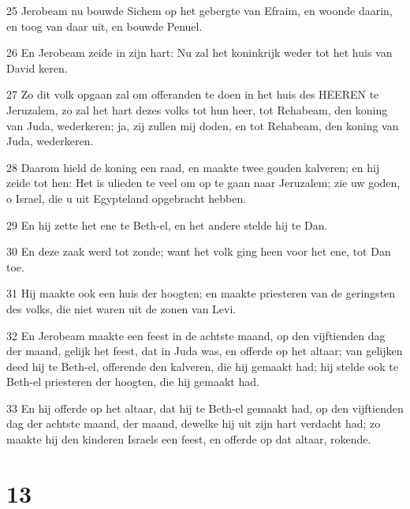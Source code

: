 \par 25 Jerobeam nu bouwde Sichem op het gebergte van Efraim, en woonde daarin, en toog van daar uit, en bouwde Penuel.
\par 26 En Jerobeam zeide in zijn hart: Nu zal het koninkrijk weder tot het huis van David keren.
\par 27 Zo dit volk opgaan zal om offeranden te doen in het huis des HEEREN te Jeruzalem, zo zal het hart dezes volks tot hun heer, tot Rehabeam, den koning van Juda, wederkeren; ja, zij zullen mij doden, en tot Rehabeam, den koning van Juda, wederkeren.
\par 28 Daarom hield de koning een raad, en maakte twee gouden kalveren; en hij zeide tot hen: Het is ulieden te veel om op te gaan naar Jeruzalem; zie uw goden, o Israel, die u uit Egypteland opgebracht hebben.
\par 29 En hij zette het ene te Beth-el, en het andere stelde hij te Dan.
\par 30 En deze zaak werd tot zonde; want het volk ging heen voor het ene, tot Dan toe.
\par 31 Hij maakte ook een huis der hoogten; en maakte priesteren van de geringsten des volks, die niet waren uit de zonen van Levi.
\par 32 En Jerobeam maakte een feest in de achtste maand, op den vijftienden dag der maand, gelijk het feest, dat in Juda was, en offerde op het altaar; van gelijken deed hij te Beth-el, offerende den kalveren, die hij gemaakt had; hij stelde ook te Beth-el priesteren der hoogten, die hij gemaakt had.
\par 33 En hij offerde op het altaar, dat hij te Beth-el gemaakt had, op den vijftienden dag der achtste maand, der maand, dewelke hij uit zijn hart verdacht had; zo maakte hij den kinderen Israels een feest, en offerde op dat altaar, rokende.

\chapter{13}

